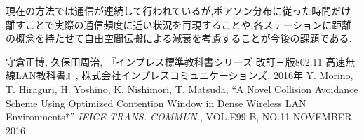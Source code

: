 \documentclass[a4paper, 10pt]{ltjsarticle}
\begin{document}
現在の方法では通信が連続して行われているが,ポアソン分布に従った時間だけ離すことで実際の通信頻度に近い状況を再現することや,各ステーションに距離の概念を持たせて自由空間伝搬による減衰を考慮することが今後の課題である.

\begin{thebibliography}{9}
  守倉正博, 久保田周治, 『インプレス標準教科書シリーズ 改訂三版802.11 高速無線LAN教科書』, 株式会社インプレスコミュニケーションズ, 2016年
  Y. Morino, T. Hiraguri, H. Yoshino, K. Nishimori, T. Matsuda, ``A Novel Collision Avoidance Scheme Using Optimized Contention Window in Dense Wireless LAN Environments*'' \; \textit{IEICE TRANS. COMMUN.}, VOL.E99-B, NO.11 NOVEMBER 2016
\end{thebibliography}
\end{document}
